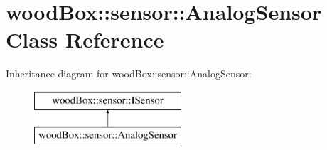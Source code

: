 \hypertarget{classwood_box_1_1sensor_1_1_analog_sensor}{}\section{wood\+Box\+:\+:sensor\+:\+:Analog\+Sensor Class Reference}
\label{classwood_box_1_1sensor_1_1_analog_sensor}
Inheritance diagram for wood\+Box\+:\+:sensor\+:\+:Analog\+Sensor\+:\begin{figure}[H]
\begin{center}
\leavevmode
\includegraphics[height=2.000000cm]{classwood_box_1_1sensor_1_1_analog_sensor}
\end{center}
\end{figure}
